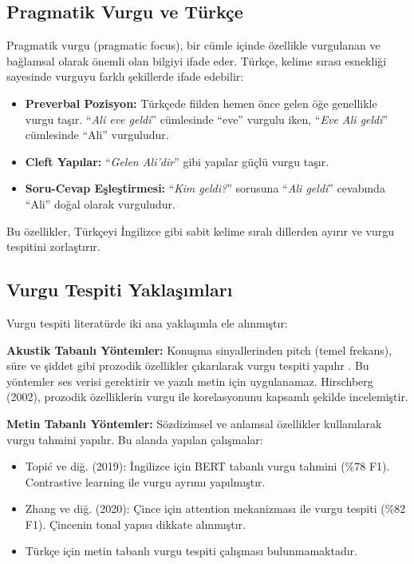 \documentclass[conference]{IEEEtran}
\begin{document}
\subsection{Pragmatik Vurgu ve Türkçe}
Pragmatik vurgu (pragmatic focus), bir cümle içinde özellikle vurgulanan ve bağlamsal olarak önemli olan bilgiyi ifade eder. Türkçe, kelime sırası esnekliği sayesinde vurguyu farklı şekillerde ifade edebilir:

\begin{itemize}
    \item \textbf{Preverbal Pozisyon:} Türkçede fiilden hemen önce gelen öğe genellikle vurgu taşır. ``\textit{Ali eve geldi}'' cümlesinde ``eve'' vurgulu iken, ``\textit{Eve Ali geldi}'' cümlesinde ``Ali'' vurguludur.
    \item \textbf{Cleft Yapılar:} ``\textit{Gelen Ali'dir}'' gibi yapılar güçlü vurgu taşır.
    \item \textbf{Soru-Cevap Eşleştirmesi:} ``\textit{Kim geldi?}'' sorusuna ``\textit{Ali geldi}'' cevabında ``Ali'' doğal olarak vurguludur.
\end{itemize}

Bu özellikler, Türkçeyi İngilizce gibi sabit kelime sıralı dillerden ayırır ve vurgu tespitini zorlaştırır.

\subsection{Vurgu Tespiti Yaklaşımları}
Vurgu tespiti literatürde iki ana yaklaşımla ele alınmıştır:

\textbf{Akustik Tabanlı Yöntemler:} Konuşma sinyallerinden pitch (temel frekans), süre ve şiddet gibi prozodik özellikler çıkarılarak vurgu tespiti yapılır \cite{prosody1}. Bu yöntemler ses verisi gerektirir ve yazılı metin için uygulanamaz. Hirschberg (2002), prozodik özelliklerin vurgu ile korelasyonunu kapsamlı şekilde incelemiştir.

\textbf{Metin Tabanlı Yöntemler:} Sözdizimsel ve anlamsal özellikler kullanılarak vurgu tahmini yapılır. Bu alanda yapılan çalışmalar:
\begin{itemize}
    \item Topić ve diğ. (2019): İngilizce için BERT tabanlı vurgu tahmini (\%78 F1). Contrastive learning ile vurgu ayrımı yapılmıştır.
    \item Zhang ve diğ. (2020): Çince için attention mekanizması ile vurgu tespiti (\%82 F1). Çincenin tonal yapısı dikkate alınmıştır.
    \item Türkçe için metin tabanlı vurgu tespiti çalışması bulunmamaktadır.
\end{itemize}
\end{document}
